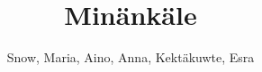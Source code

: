 \documentclass[justified,oneside,notoc]{tufte-book}
\title{Min\"ank\"ale}
\author{Snow, Maria, Aino, Anna, Kekt\"akuwte, Esra}
\begin{document}
\maketitle

\tableofcontents










\begin{appendices}


\end{appendices}
\nobibliography{}
\end{document}
